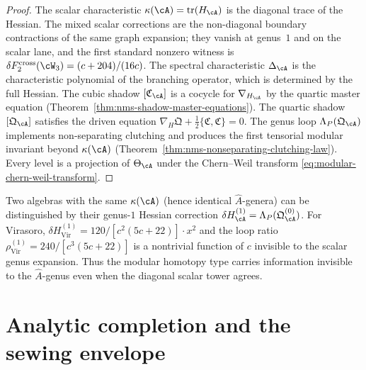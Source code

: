 \begin{proof}
The scalar characteristic $\kappa(\cA) = \operatorname{tr}(H_{\cA})$ is
the diagonal trace of the Hessian. The mixed scalar corrections are
the non-diagonal boundary contractions of the same graph expansion;
they vanish at genus~$1$ and on the scalar lane, and the first
standard nonzero witness is
$\delta F_2^{\mathrm{cross}}(\cW_3)=(c+204)/(16c)$.
The spectral characteristic $\Delta_{\cA}$
is the characteristic polynomial of the branching operator, which is
determined by the full Hessian. The cubic shadow
$[\mathfrak{C}_{\cA}]$ is a cocycle for $\nabla_{H_{\cA}}$
by the quartic master equation
(Theorem~\ref{thm:nms-shadow-master-equations}). The quartic shadow
$[\mathfrak{Q}_{\cA}]$ satisfies the driven equation
$\nabla_H\mathfrak{Q} + \frac12\{\mathfrak{C},\mathfrak{C}\} = 0$.
The genus loop $\Lambda_P(\mathfrak{Q}_{\cA})$ implements
non-separating clutching and produces the first tensorial modular
invariant beyond $\kappa(\cA)$
(Theorem~\ref{thm:nms-nonseparating-clutching-law}). Every level is
a projection of $\Theta_{\cA}$ under the Chern--Weil transform
\eqref{eq:modular-chern-weil-transform}.
\end{proof}

\begin{remark}
\label{rem:beyond-ahat-genus}
Two algebras with the same $\kappa(\cA)$ (hence identical $\hat{A}$-genera)
can be distinguished by their genus-$1$ Hessian correction
$\delta H^{(1)}_{\cA} = \Lambda_P(\mathfrak{Q}^{(0)}_{\cA})$.
For Virasoro,
$\delta H^{(1)}_{\mathrm{Vir}} = 120/[c^2(5c+22)] \cdot x^2$
and the loop ratio
$\rho^{(1)}_{\mathrm{Vir}} = 240/[c^3(5c+22)]$
is a nontrivial function of $c$ invisible to the scalar genus
expansion. Thus the modular homotopy type carries information
invisible to the $\hat{A}$-genus even when the diagonal scalar tower
agrees.
\end{remark}


\section{Analytic completion and the sewing envelope}
\label{sec:analytic-completion}

